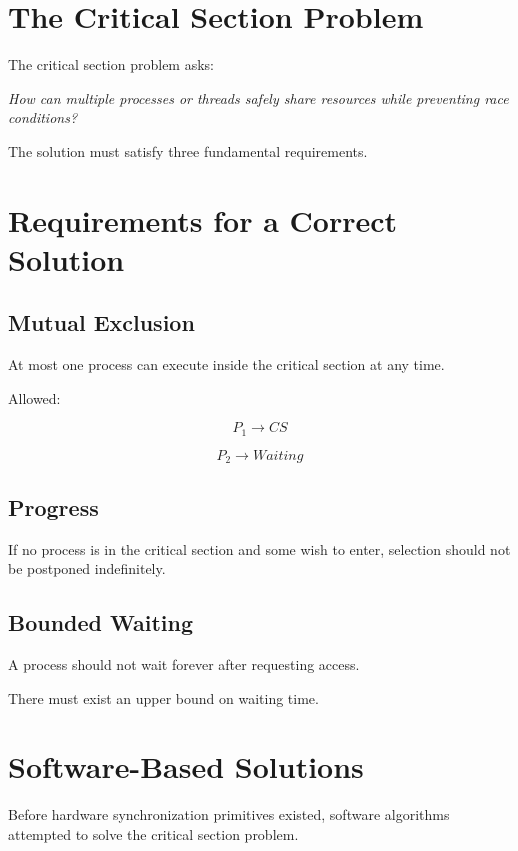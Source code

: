 \section{The Critical Section Problem}

The critical section problem asks:

\textit{How can multiple processes or threads safely share resources while preventing race conditions?}

The solution must satisfy three fundamental requirements.

\section{Requirements for a Correct Solution}

\subsection{Mutual Exclusion}

At most one process can execute inside the critical section at any time.

\begin{center}
Allowed:
\end{center}

\[
P_1 \rightarrow CS
\]

\[
P_2 \rightarrow Waiting
\]

\subsection{Progress}

If no process is in the critical section and some wish to enter, selection should not be postponed indefinitely.

\subsection{Bounded Waiting}

A process should not wait forever after requesting access.

There must exist an upper bound on waiting time.

\section{Software-Based Solutions}

Before hardware synchronization primitives existed, software algorithms attempted to solve the critical section problem.

